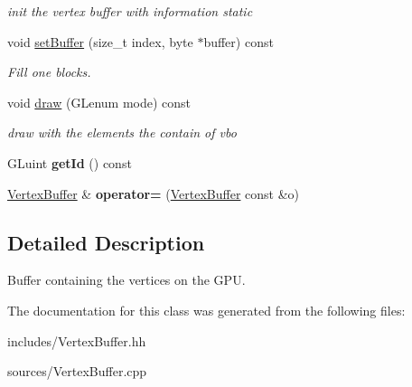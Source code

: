 \begin{DoxyCompactItemize}
\begin{DoxyCompactList}\small\item\em init the vertex buffer with information static \end{DoxyCompactList}\item 
\hypertarget{classgdl_1_1_vertex_buffer_ad7f6c00e20568a57069bfc58aada1237}{void \hyperlink{classgdl_1_1_vertex_buffer_ad7f6c00e20568a57069bfc58aada1237}{set\-Buffer} (size\-\_\-t index, byte $\ast$buffer) const }\label{classgdl_1_1_vertex_buffer_ad7f6c00e20568a57069bfc58aada1237}

\begin{DoxyCompactList}\small\item\em Fill one blocks. \end{DoxyCompactList}\item 
\hypertarget{classgdl_1_1_vertex_buffer_ac9d3a2c6e703fd9104958f25285b5025}{void \hyperlink{classgdl_1_1_vertex_buffer_ac9d3a2c6e703fd9104958f25285b5025}{draw} (G\-Lenum mode) const }\label{classgdl_1_1_vertex_buffer_ac9d3a2c6e703fd9104958f25285b5025}

\begin{DoxyCompactList}\small\item\em draw with the elements the contain of vbo \end{DoxyCompactList}\item 
\hypertarget{classgdl_1_1_vertex_buffer_ad92cad96c22aed0f8db75eb97b1945f2}{G\-Luint {\bfseries get\-Id} () const }\label{classgdl_1_1_vertex_buffer_ad92cad96c22aed0f8db75eb97b1945f2}

\item 
\hypertarget{classgdl_1_1_vertex_buffer_a450daa8891ddcfee156a87d520536eef}{\hyperlink{classgdl_1_1_vertex_buffer}{Vertex\-Buffer} \& {\bfseries operator=} (\hyperlink{classgdl_1_1_vertex_buffer}{Vertex\-Buffer} const \&o)}\label{classgdl_1_1_vertex_buffer_a450daa8891ddcfee156a87d520536eef}

\end{DoxyCompactItemize}


\subsection{Detailed Description}
Buffer containing the vertices on the G\-P\-U. 

The documentation for this class was generated from the following files\-:\begin{DoxyCompactItemize}
\item 
includes/Vertex\-Buffer.\-hh\item 
sources/Vertex\-Buffer.\-cpp\end{DoxyCompactItemize}
